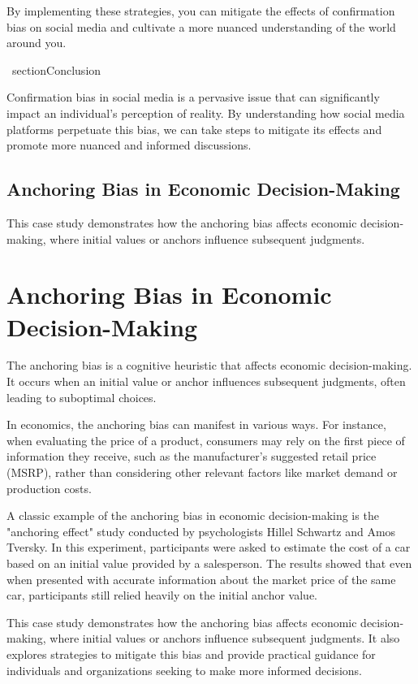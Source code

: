 \documentclass{report}%
\begin{document}
{{{{{{{{{{{{{{By implementing these strategies, you can mitigate the effects of confirmation bias on social media and cultivate a more nuanced understanding of the world around you.

\ section{Conclusion}

Confirmation bias in social media is a pervasive issue that can significantly impact an individual's perception of reality. By understanding how social media platforms perpetuate this bias, we can take steps to mitigate its effects and promote more nuanced and informed discussions.%
\section{Anchoring Bias in Economic Decision{-}Making}%
This case study demonstrates how the anchoring bias affects economic decision-making, where initial values or anchors influence subsequent judgments.

%
\chapter{Anchoring Bias in Economic Decision-Making}

The anchoring bias is a cognitive heuristic that affects economic decision-making. It occurs when an initial value or anchor influences subsequent judgments, often leading to suboptimal choices.

In economics, the anchoring bias can manifest in various ways. For instance, when evaluating the price of a product, consumers may rely on the first piece of information they receive, such as the manufacturer's suggested retail price (MSRP), rather than considering other relevant factors like market demand or production costs.

A classic example of the anchoring bias in economic decision-making is the "anchoring effect" study conducted by psychologists Hillel Schwartz and Amos Tversky. In this experiment, participants were asked to estimate the cost of a car based on an initial value provided by a salesperson. The results showed that even when presented with accurate information about the market price of the same car, participants still relied heavily on the initial anchor value.

This case study demonstrates how the anchoring bias affects economic decision-making, where initial values or anchors influence subsequent judgments. It also explores strategies to mitigate this bias and provide practical guidance for individuals and organizations seeking to make more informed decisions.

}}}}}}}}}}}}}}
\end{document}
